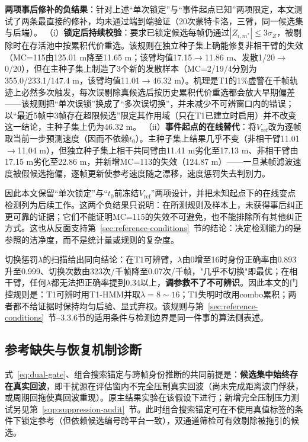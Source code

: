\documentclass[UTF8,a4paper,zihao=-4]{ctexart}
\begin{document}
\textbf{两项事后修补的负结果}：针对上述“单次锁定”与“事件起点已知”两项限定，本文测试了两条最直接的修补，均未通过端到端验证（20次蒙特卡洛，三臂，同一候选集与后端）。
（i）\textbf{锁定后持续校验}：要求已锁定候选每帧仍通过\(|Z_{i,m^*}|\le3\sigma_Z\)，被剔除时在存活池中按累积代价重选。该规则在独立种子集上确能修复非相干臂的失效（MC=115由125.01 m降至11.65 m；该臂均值17.15\(\to\)11.86 m、发散1/20\(\to\)0/20），但在主种子集上制造了3个新的发散样本（MC=2/19/4分别为355.0/233.1/147.4 m，该臂均值11.01\(\to\)46.32 m）。机理是T1的1\%虚警在千帧轨迹上必然多次触发，每次误剔除真候选后按历史累积代价重选都会放大早期偏差——该规则把“单次误锁”换成了“多次误切换”，并未减少不可辨窗口内的错误；以“最近5帧中3帧存在超限候选”限定其作用域（只在T1已建立时启用）并不改变这一结论，主种子集上仍为46.32 m。
（ii）\textbf{事件起点的在线替代}：将\(V_{\mathrm{ref}}\)改为逐帧取当前一步预测速度（因而不依赖\(t_0\)）。主种子集上结果几乎不变（非相干臂11.01\(\to\)11.04 m），但独立种子集上相干共同臂由11.41 m劣化至17.13 m、非相干臂由17.15 m劣化至22.86 m，并新增MC=113的失效（124.87 m）——一旦某帧滤波速度被假候选拖偏，逐帧更新使参考速度随之漂移，速度惩罚失去判别力。

因此本文保留“单次锁定”与“\(t_0\)前冻结\(V_{\mathrm{ref}}\)”两项设计，并把未知起点下的在线变点检测列为后续工作。这两个负结果只说明：在所测规则及样本上，未获得事后纠正更可靠的证据；它们不能证明MC=115的失效不可避免，也不能排除所有其他纠正方式。这也从反面支持第~\ref{sec:reference-conditions}~节的结论：决定检测能力的是参照的洁净度，而不是统计量或规则的复杂度。

切换惩罚\(\lambda\)的扫描给出同向结论：在T1可辨臂，\(\lambda\)由0增至16时身份正确率由0.893升至0.999、切换次数由323次/千帧降至0.07次/千帧，"几乎不切换"即最优；在相干臂，任何\(\lambda\)都无法把正确率提到0.34以上，\textbf{调参救不了不可辨识}。因此本文的门控规则是：T1可辨时用T1-HMM并取\(\lambda=8\sim16\)；T1失明时改用combo累积；两者都不给证据时保持均匀后验、显式弃权。该规则与第~\ref{sec:reference-conditions}~节--3.3.6节的适用条件与检测边界是同一件事的算法侧表述。



\subsection{参考缺失与恢复机制诊断}\label{sup:recovery}
式~\eqref{eq:dual-gate}、组合搜索锚定与跨帧身份推断的共同前提是：\textbf{候选集中始终存在真实回波}，即干扰源在评估窗内不完全压制真实回波（尚未完成距离波门俘获，或周期回拖使真回波重现）。原主结果实验在该假设下进行；新增完全压制压力测试另见第~\ref{sup:suppression-audit}~节。此时组合搜索锚定可在不使用真值标签的条件下锁定参考（但依赖候选编号跨平台一致），双通道筛检可有效剔除被拖引的候选。
\end{document}
